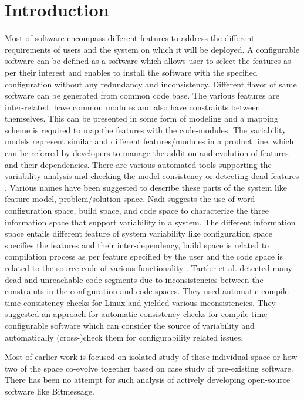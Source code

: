 \documentclass{acm_proc_article-sp}
\begin{document}
\section{Introduction}
Most of software encompass different features to address the different requirements of users and the system on which it will be deployed. A configurable software can be defined as a software which allows user to select the features as per their interest and enables to install the software with the specified configuration without any redundancy and inconsistency. Different flavor of same software can be generated from common code base. The various features are inter-related, have common modules and also have constraints between themselves. This can be presented in some form of modeling and a mapping scheme is required to map the features with the code-modules. The variability models represent similar and different features/modules in a product line, which can be referred by developers to manage the addition and evolution of features and their dependencies. There are various automated tools supporting the variability analysis and checking the model consistency or detecting dead features \cite{Berger} \cite{Benavides}. Various names have been suggested to describe these parts of the system like feature model, problem/solution space. Nadi \cite{Nadi}  suggests the use of word configuration space, build space, and code space to characterize the three information space that support variability in a system. The different information space entails different feature of system variability like configuration space specifies the features and their inter-dependency, build space is related to compilation process as per feature specified by the user and the code space is related to the source code of various functionality \cite{Nadi}.
Tartler et al. \cite{Tartler} detected many dead and unreachable code segments due to inconsistencies between the constraints in the configuration and code spaces. They used automatic compile-time consistency checks for Linux and yielded various inconsistencies. They suggested an approach for automatic consistency checks for compile-time configurable software which can consider the source of variability and automatically (cross-)check them for configurability related issues.

Most of earlier work is focused on isolated study of these individual space or how two of the space co-evolve together based on case study of pre-existing software. There has been no attempt for such analysis of actively developing open-source software like Bitmessage.
\end{document}
